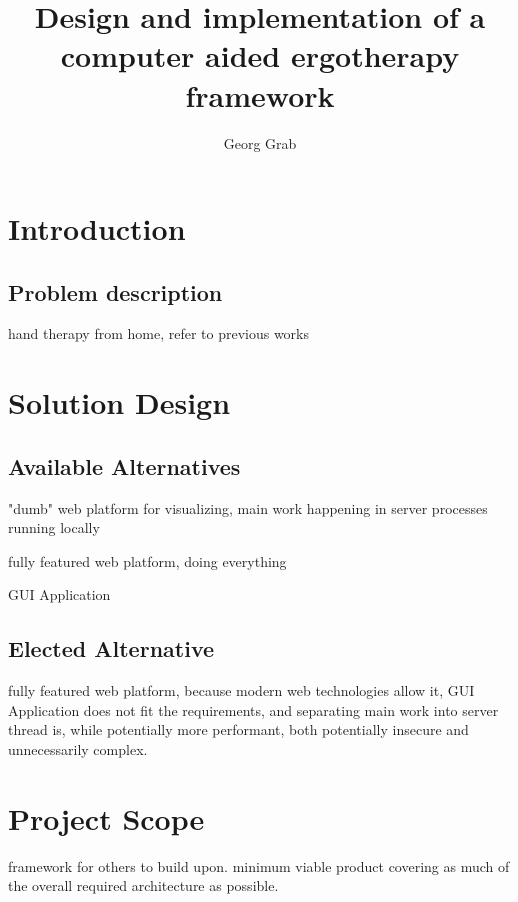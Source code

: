 \documentclass[master,english]{hgbthesis}
\title{Design and implementation of a computer aided ergotherapy framework}
\author{Georg Grab}
\begin{document}

\frontmatter							%

\maketitle
\tableofcontents



\mainmatter          			%
\chapter{Introduction}
\section{Problem description}
hand therapy from home, refer to previous works
\chapter{Solution Design}
\section{Available Alternatives}
"dumb" web platform for visualizing, main work happening in server processes running locally

fully featured web platform, doing everything

GUI Application
\section{Elected Alternative}
fully featured web platform, because modern web technologies allow it, GUI Application does not fit the requirements, and separating main work into server thread is, while potentially more performant, both potentially insecure and unnecessarily complex.
\chapter{Project Scope}
framework for others to build upon. minimum viable product covering as much of the overall required architecture as possible.
\end{document}

